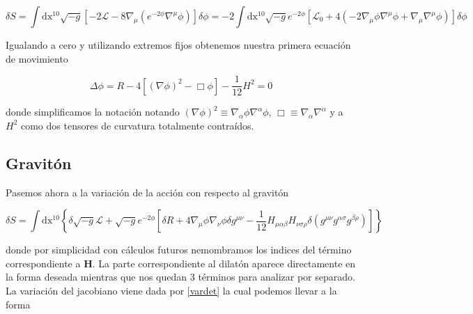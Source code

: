\documentclass{article}
\numberwithin{equation}{section}
\begin{document}
\begin{equation*}
\delta S = \int\mathrm{dx^{10}}\sqrt{-g} \left[-2 \mathscr{L}  - 8 \nabla_{\mu} \left( e^{-2\phi} \nabla^{\mu} \phi \right) \right] \delta \phi = 	-2 \int\mathrm{dx^{10}}\sqrt{-g} e^{-2\phi}\left[  \mathscr{L}_0 + 4 \left( -2 \nabla_{\mu}\phi\nabla^{\mu}\phi + \nabla_{\mu}\nabla^{\mu} \phi \right) \right] \delta \phi
\end{equation*} 

Igualando a cero y utilizando extremos fijos obtenemos nuestra primera ecuación de movimiento

\vspace{0.4cm}
\begin{boxquation}	
\begin{equation}\label{eqdil}
\Delta \phi = R - 4 \left[ \left(\nabla \phi\right)^2 - \Box \phi \right] - \frac{1}{12} H^2 = 0
\end{equation}
\end{boxquation}

donde simplificamos la notación notando $ \left(\nabla \phi\right)^2 \equiv \nabla_{\alpha} \phi \nabla^{\alpha} \phi $, $ \Box \equiv \nabla_{\alpha}\nabla^{\alpha} $ y a $ H^2 $ como dos tensores de curvatura totalmente contraídos.

\vspace{0.4cm}

\subsection{Gravitón}

Pasemos ahora a la variación de la acción con respecto al gravitón

\begin{equation}\label{vargra}
\delta S = \int\mathrm{dx^{10}} \left\{ \delta \sqrt{-g} \mathscr{L} + \sqrt{-g} e^{-2\phi} \left[\delta R + 4 \nabla_{\mu}\phi\nabla_{\nu}\phi \delta g^{\mu\nu} - \frac{1}{12} H_{\mu \alpha \beta}H_{\nu \sigma \rho} \delta \left( g^{\mu\nu} g^{\alpha\sigma} g^{\beta\rho}\right)\right]  \right\}
\end{equation}

donde por simplicidad con cálculos futuros nemombramos los indices del término correspondiente a $ \textbf{H} $. La parte correspondiente al dilatón aparece directamente en la forma deseada mientras que nos quedan 3 términos para analizar por separado.\\ 

La variación del jacobiano viene dada por \ref{vardet} la cual podemos llevar a la forma 
\end{document}
